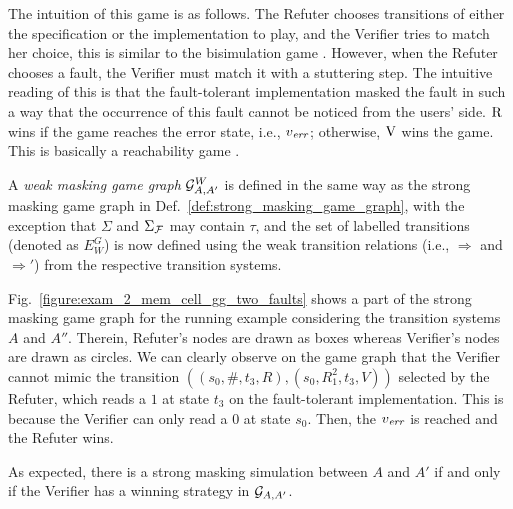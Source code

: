 The intuition of this game is as follows. 
The Refuter chooses transitions of either the specification or the implementation to play,
and the Verifier tries to match her choice, this is similar to the bisimulation game \cite{Stirling99}. 
However, when the Refuter chooses a fault, the Verifier must match it with a stuttering step.
The intuitive reading of this is that the fault-tolerant implementation masked the fault in such a way that the occurrence of this fault cannot be noticed from the users' side. $\mathrm{R}$ wins if the game reaches the error state, i.e., $v_{\mathit{err}}$; otherwise, $\mathrm{V}$ wins  the game. 
This is basically a reachability game \cite{Jurd11}.

A \emph{weak masking game graph} $\mathcal{G}^W_{A,A'}$ is defined
in the same way as the strong masking game graph in
Def.~\ref{def:strong_masking_game_graph}, with the exception that
$\Sigma$ and $\Sigma_{\mathcal{F}}$ may contain $\tau$, and the set of labelled
transitions (denoted as $E_W^G$) is now defined using the weak
transition relations (i.e., $\Rightarrow$ and $\Rightarrow'$) from the respective
transition systems.

Fig.~\ref{figure:exam_2_mem_cell_gg_two_faults} shows a part 
of the strong masking game graph for the running example considering the transition 
systems $A$ and $A''$. Therein, Refuter's nodes are drawn as boxes whereas Verifier's nodes are drawn as circles.
We can clearly observe on the game graph that the Verifier cannot mimic the 
transition $((s_0, \#, t_3, R),(s_0, R_1^2, t_3, V))$
selected by the Refuter, which reads a $1$ at state $t_3$ on the fault-tolerant 
implementation. This is because the Verifier can only read a $0$ at state $s_0$. 
Then, the $v_{\mathit{err}}$ is reached and the Refuter wins.

As expected, there is a strong masking simulation between $A$ and $A'$
if and only if the Verifier has a winning strategy in $\mathcal{G}_{A, A'}$.

